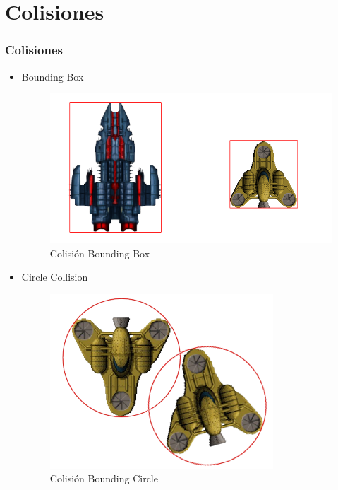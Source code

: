 \documentclass[xcolor={dvipsnames}]{beamer}
\begin{document}
\section{Colisiones}
\begin{frame}[fragile]\frametitle{Colisiones}
    \begin{itemize}
        \item Bounding Box
            \begin{figure}
            \includegraphics[scale=0.2]{images/collisions1}
            \caption{Colisión Bounding Box}
            \end{figure}
        \item Circle Collision
            \begin{figure}
            \includegraphics[scale=0.2]{images/collisions2}
            \caption{Colisión Bounding Circle}
            \end{figure}
    \end{itemize}
\end{frame}
\end{document}

